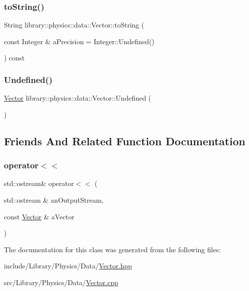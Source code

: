 \subsubsection{\texorpdfstring{to\+String()}{toString()}}
{\footnotesize\ttfamily String library\+::physics\+::data\+::\+Vector\+::to\+String (\begin{DoxyParamCaption}\item[{const Integer \&}]{a\+Precision = {\ttfamily Integer\+:\+:Undefined()} }\end{DoxyParamCaption}) const}

\mbox{\label{classlibrary_1_1physics_1_1data_1_1_vector_a75b4dda1e2ddffc9ee76b2c5e9ff2aaf}} 
\subsubsection{\texorpdfstring{Undefined()}{Undefined()}}
{\footnotesize\ttfamily \hyperlink{classlibrary_1_1physics_1_1data_1_1_vector}{Vector} library\+::physics\+::data\+::\+Vector\+::\+Undefined (\begin{DoxyParamCaption}{ }\end{DoxyParamCaption})\hspace{0.3cm}{\ttfamily [static]}}



\subsection{Friends And Related Function Documentation}
\mbox{\label{classlibrary_1_1physics_1_1data_1_1_vector_a2f1253dbad20965d2209456421eabf71}} 
\subsubsection{\texorpdfstring{operator$<$$<$}{operator<<}}
{\footnotesize\ttfamily std\+::ostream\& operator$<$$<$ (\begin{DoxyParamCaption}\item[{std\+::ostream \&}]{an\+Output\+Stream,  }\item[{const \hyperlink{classlibrary_1_1physics_1_1data_1_1_vector}{Vector} \&}]{a\+Vector }\end{DoxyParamCaption})\hspace{0.3cm}{\ttfamily [friend]}}



The documentation for this class was generated from the following files\+:\begin{DoxyCompactItemize}
\item 
include/\+Library/\+Physics/\+Data/\hyperlink{_vector_8hpp}{Vector.\+hpp}\item 
src/\+Library/\+Physics/\+Data/\hyperlink{_vector_8cpp}{Vector.\+cpp}\end{DoxyCompactItemize}
